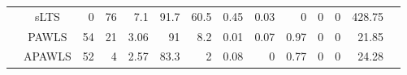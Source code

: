 \documentclass{article}\usepackage[]{graphicx}\usepackage[]{color}
\begin{document}
\begin{table}[thp]
\begin{center}
\begin{tabular}{ccrrrrrrrrrrrr}
	       & sLTS & 0 & 76 & 7.1 & 
	      91.7 & 60.5 &
	      0.45 & 0.03 & 0
	      & 0 & 0 & 428.75\\
	      
	      & PAWLS & 54 & 21 & 3.06 & 
	      91 & 8.2 &
	      0.01 & 0.07 & 0.97
	      & 0 & 0 & 21.85\\
	      
	      & APAWLS & 52 & 4 & 2.57 & 
	      83.3 & 2 &
	      0.08 & 0 & 0.77
	      & 0 & 0 & 24.28\\
	      
	   \hline\hline
	
	\end{tabular}
	\end{center}
	\end{table}
	
\end{document}
